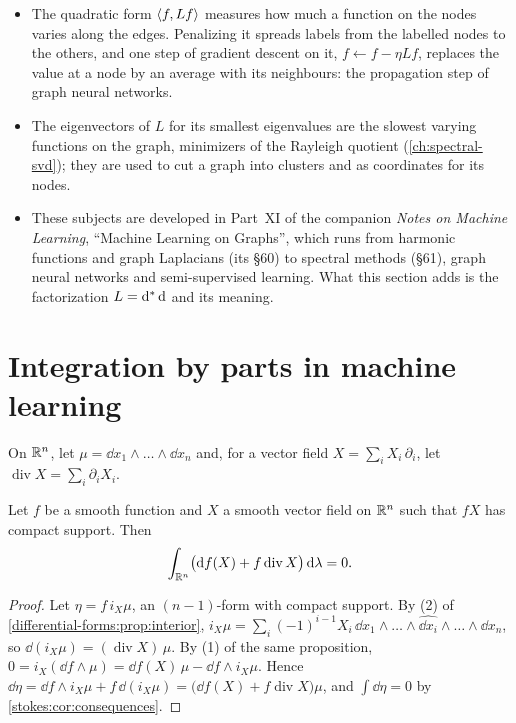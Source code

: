 \begin{notechapter}
\begin{mlthread}
\begin{itemize}[nosep]
  \item The quadratic form $\left\langle f, Lf \right\rangle$ measures how much a function
        on the nodes varies along the edges. Penalizing it spreads
        labels from the labelled nodes to the others, and one step of
        gradient descent on it, $f\leftarrow f - \eta Lf$, replaces the
        value at a node by an average with its neighbours: the
        propagation step of graph neural networks.
  \item The eigenvectors of $L$ for its smallest eigenvalues are the
        slowest varying functions on the graph, minimizers of the
        Rayleigh quotient (\cref{ch:spectral-svd}); they are used to
        cut a graph into clusters and as coordinates for its nodes.
  \item These subjects are developed in Part~XI of the companion
        \emph{Notes on Machine Learning}, ``Machine Learning on
        Graphs'', which runs from harmonic functions and graph
        Laplacians (its \S60) to spectral methods (\S61), graph neural
        networks and semi-supervised learning. What this section adds is
        the factorization $L = \mathrm{d}^{*}\,\mathrm{d}$ and its meaning.
\end{itemize}
\end{mlthread}

\section{Integration by parts in machine learning}
\label{stokes:sec:ml}

On $\mathbb{R}^n$, let $\mu = \dd x_1\wedge\dots\wedge\dd x_n$ and, for a
vector field $X = \sum_iX_i\,\partial_i$, let
$\operatorname{div}X = \sum_i\partial_iX_i$.

\begin{proposition}
\label{stokes:prop:parts}
Let $f$ be a smooth function and $X$ a smooth vector field on $\mathbb{R}^n$
such that $fX$ has compact support. Then
\[
  \int_{\mathbb{R}^n}\bigl(\mathrm{d} f(X) + f\operatorname{div}X\bigr)\,\mathrm{d}\lambda
  = 0 .
\]
\end{proposition}

\begin{proof}
Let $\eta = f\,i_X\mu$, an $(n - 1)$-form with compact support. By (2)
of \cref{differential-forms:prop:interior},
$i_X\mu = \sum_i(-1)^{i-1}X_i\,\dd x_1\wedge\dots\wedge
\widehat{\dd x_i}\wedge\dots\wedge\dd x_n$, so
$\dd(i_X\mu) = (\operatorname{div}X)\,\mu$. By (1) of the same
proposition, $0 = i_X(\dd f\wedge\mu)
= \dd f(X)\,\mu - \dd f\wedge i_X\mu$. Hence
$\dd\eta = \dd f\wedge i_X\mu + f\,\dd(i_X\mu)
= \bigl(\dd f(X) + f\operatorname{div}X\bigr)\mu$, and
$\int\dd\eta = 0$ by \cref{stokes:cor:consequences}.
\end{proof}


\end{notechapter}
